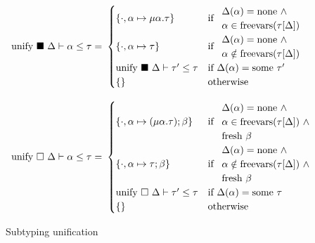 \documentclass[sigplan,screen]{acmart}
\begin{document}
\begin{figure}[h]
  \[
    \begin{array}{l @{} l @{} l @{} l }
    \text{unify } \blacksquare\ \Delta &{} \vdash \alpha \leq \tau	
    &{}=\ &{} 
      \begin{cases}  
        \{ \cdot,\alpha \mapsto \mu\alpha.\tau \}
        & \text{if } 
        \begin{array}{l}
          \Delta(\alpha) = \text{none} \ \wedge \\
          \alpha \in \text{freevars}(\tau[\Delta])
        \end{array}
        \\
        \{ \cdot,\alpha \mapsto \tau \}
        & \text{if } 
        \begin{array}{l}
          \Delta(\alpha) = \text{none} \ \wedge \\
          \alpha \notin \text{freevars}(\tau[\Delta])
        \end{array}
        \\
        \text{unify } \blacksquare\ \Delta \vdash \tau' \leq \tau
        &\text{if } \Delta(\alpha) = \text{some } \tau'
        \\
        \{\}
        &\text{otherwise}
      \end{cases}
    \\
    \\
    \text{unify } \square\ \Delta &{} \vdash \alpha \leq \tau	
    &{}=\ &{} 
      \begin{cases}  
        \{ \cdot,\alpha \mapsto (\mu\alpha.\tau);\beta \}
        & \text{if } 
        \begin{array}{l}
          \Delta(\alpha) = \text{none} \ \wedge \\
          \alpha \in \text{freevars}(\tau[\Delta]) \ \wedge \\
          \text{fresh } \beta
        \end{array}
        \\
        \{ \cdot,\alpha \mapsto \tau;\beta \}
        & \text{if } 
        \begin{array}{l}
          \Delta(\alpha) = \text{none} \ \wedge \\
          \alpha \notin \text{freevars}(\tau[\Delta]) \ \wedge \\
          \text{fresh } \beta
        \end{array}
        \\
        \text{unify } \square\ \Delta \vdash \tau' \leq \tau
        &\text{if } \Delta(\alpha) = \text{some } \tau
        \\
        \{\}
        &\text{otherwise}
      \end{cases}
    \end{array}
  \]

  \caption{Subtyping unification}
\end{figure}
\end{document}

